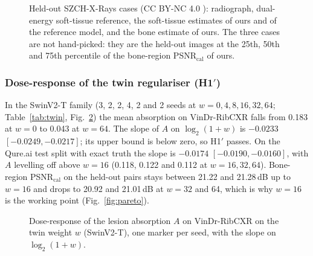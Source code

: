 \begin{figure}[!t]
\centering
{}
\caption{Held-out SZCH-X-Rays cases (CC BY-NC 4.0 \cite{sun2026bsldm}): radiograph, dual-energy soft-tissue reference, the soft-tissue
estimates of ours and of the reference model, and the bone estimate of ours. The three cases are not hand-picked: they are the held-out
images at the 25th, 50th and 75th percentile of the bone-region PSNR$_{\mathrm{cal}}$ of ours.}
\label{fig:qualitative}
\end{figure}

\subsubsection{Dose-response of the twin regulariser (H1$'$)}
In the SwinV2-T family (3, 2, 2, 4, 2 and 2 seeds at $w=0,4,8,16,32,64$; Table~\ref{tab:twin}, Fig.~\ref{fig:dose_response}) the mean
absorption on VinDr-RibCXR falls from 0.183 at $w=0$ to 0.043 at $w=64$. The slope of $A$ on $\log_2(1+w)$ is $-0.0233$
$[-0.0249,-0.0217]$; its upper bound is below zero, so H1$'$ passes. On the Qure.ai test split with exact truth the slope is $-0.0174$
$[-0.0190,-0.0160]$, with $A$ levelling off above $w=16$ (0.118, 0.122 and 0.112 at $w=16,32,64$). Bone-region PSNR$_{\mathrm{cal}}$ on the
held-out pairs stays between 21.22 and 21.28\,dB up to $w=16$ and drops to 20.92 and 21.01\,dB at $w=32$ and 64, which is why $w=16$ is the
working point (Fig.~\ref{fig:pareto}).

\begin{table}[!t]
\centering
\caption{Twin regulariser. Top: dose-response of the lesion absorption on the twin weight (SwinV2-T family): seeds per weight, mean $A$ on
VinDr-RibCXR and on the Qure.ai test split, and the slope with its image-cluster bootstrap interval; each weight averages all of its seeds
(four at $w=16$, seeds 0--3), whereas the encoder comparisons use seeds 0--2. Bottom: ablation at $w=16$ (SwinV2-T, 300k samples, mean over
seeds), one factor changed per row; development evidence (audit on all 75 SZCH images, bone PSNR$_{\mathrm{cal}}$ on the 24 development
pairs).}
\label{tab:twin}
\end{table}

\begin{figure}[!t]
\centering
{}
\caption{Dose-response of the lesion absorption $A$ on VinDr-RibCXR on the twin weight $w$ (SwinV2-T), one marker per seed, with the slope
on $\log_2(1+w)$.}
\label{fig:dose_response}
\end{figure}

